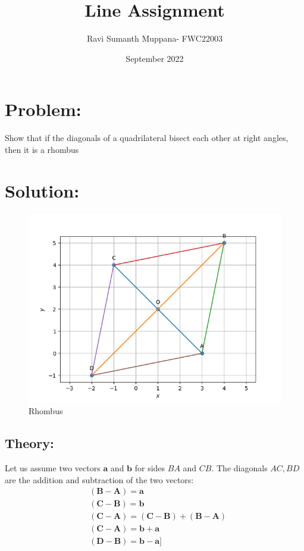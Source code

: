 \documentclass[a4paper,12pt,twocolumn]{article}
\title{Line Assignment}
\author{Ravi Sumanth Muppana- FWC22003}
\date{September 2022}
\let\vec\mathbf
\begin{document}
\maketitle
\section{Problem:}
Show that if the diagonals of a quadrilateral bisect each other at right angles, then it is a rhombus
\maketitle
\section{Solution:}
\begin{figure}[h]
	\includegraphics[width=\linewidth]{rhombus.png}
	\caption{Rhombus}
\end{figure}
\subsection{Theory:}
Let us assume two vectors $\vec{a}$ and $\vec{b}$ for sides $BA$ and $CB$. The diagonals $AC,BD$ are the addition and subtraction of the two vectors:
\begin{align}
	&\vec{(B-A)} = \vec{a}\\
	&\vec{(C-B)} = \vec{b}\\
	&\vec{(C-A)} = \vec{(C-B)} +\vec{(B-A)}\\
	&\vec{(C-A)} = \vec{b+a}\\
	&\vec{(D-B)} = \vec{b-a}]\\
\end{align}
\end{document}
